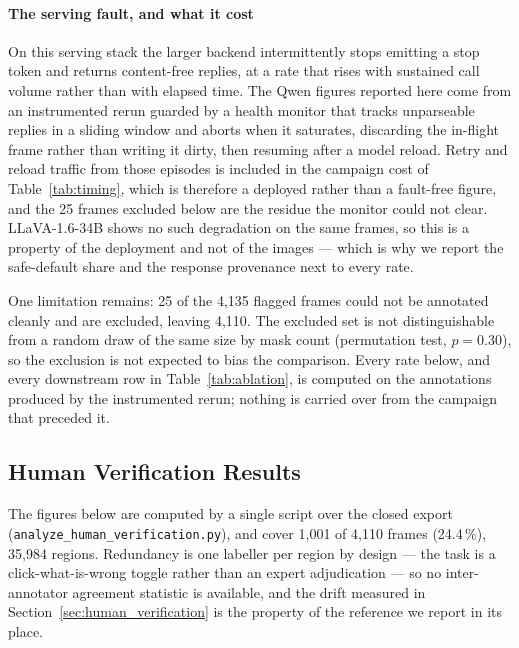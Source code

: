\documentclass[conference]{IEEEtran}
\newcommand{\humancoverage}{1{,}001 of 4{,}110 frames (24.4\,\%), 35{,}984 regions}
\begin{document}
\paragraph{The serving fault, and what it cost}
On this serving stack the larger backend intermittently stops emitting a stop token and returns content-free replies, at a rate that rises with sustained call volume rather than with elapsed time.
The Qwen figures reported here come from an instrumented rerun guarded by a health monitor that tracks unparseable replies in a sliding window and aborts when it saturates, discarding the in-flight frame rather than writing it dirty, then resuming after a model reload.
Retry and reload traffic from those episodes is included in the campaign cost of Table~\ref{tab:timing}, which is therefore a deployed rather than a fault-free figure, and the 25 frames excluded below are the residue the monitor could not clear.
LLaVA-1.6-34B shows no such degradation on the same frames, so this is a property of the deployment and not of the images --- which is why we report the safe-default share and the response provenance next to every rate.

One limitation remains: 25 of the 4{,}135 flagged frames could not be annotated cleanly and are excluded, leaving 4{,}110. The excluded set is not distinguishable from a random draw of the same size by mask count (permutation test, $p{=}0.30$), so the exclusion is not expected to bias the comparison.
Every rate below, and every downstream row in Table~\ref{tab:ablation}, is computed on the annotations produced by the instrumented rerun; nothing is carried over from the campaign that preceded it.

\subsection{Human Verification Results}
\label{sec:human_results}

The figures below are computed by a single script over the closed export
(\texttt{analyze\_human\_verification.py}), and cover \humancoverage.
Redundancy is one labeller per region by design --- the task is a click-what-is-wrong toggle rather
than an expert adjudication --- so no inter-annotator agreement statistic is available, and the
drift measured in Section~\ref{sec:human_verification} is the property of the reference we report in
its place.
\end{document}

